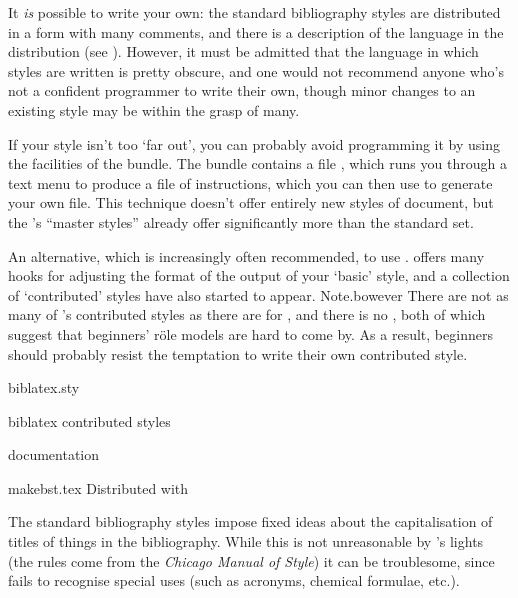 
It \emph{is} possible to write your own: the standard bibliography
styles are distributed in a form with many comments, and there is a description
of the language in the \BibTeX{} distribution (see %
).
However, it must be admitted that the language in which \BibTeX{}
styles are written is pretty obscure, and one would not recommend
anyone who's not a confident programmer to write their own, though
minor changes to an existing style may be within the grasp of many.

If your style isn't too `far out', you can probably avoid programming
it by using the facilities of the  bundle.  The bundle
contains a file , which runs you through a text menu
to produce a file of instructions, which you can then use to generate your
own  file.  This technique doesn't offer entirely new styles
of document, but the 's ``master \BibTeX{}
styles'' already offer significantly more than the \BibTeX{} standard set.

An alternative, which is increasingly often recommended, to use
.   offers
many hooks for adjusting the format of the output of your `basic'
\BibTeX{} style, and a collection of `contributed' styles have also
started to appear.  Note.bowever There are not as many of
's contributed styles as there are for \BibTeX{},
and there is no , both of which suggest that
beginners' r\"ole models are hard to come by.  As a result, beginners
should probably resist the temptation to write their own contributed
 style.
\begin{ctanrefs}
\item[biblatex.sty]
\item[biblatex \nothtml{\normalfont}contributed styles]
\item[\nothtml{\normalfont}\BibTeX{} documentation]
\item[makebst.tex]Distributed with 
\end{ctanrefs}


The standard \BibTeX{} bibliography styles impose fixed ideas about
the capitalisation of titles of things in the bibliography.  While
this is not unreasonable by \BibTeX{}'s lights (the rules come from
the \emph{Chicago Manual of Style}) it can be troublesome, since
\BibTeX{} fails to recognise special uses (such as acronyms, chemical
formulae, etc.).

